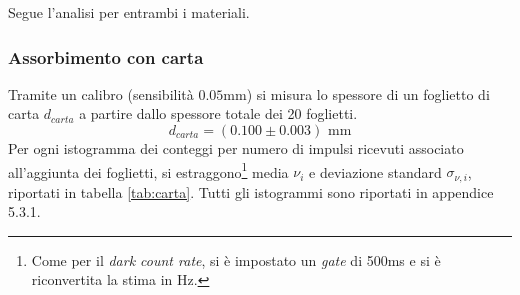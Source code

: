 Segue l'analisi per entrambi i materiali.

\subsubsection{Assorbimento con carta}
Tramite un calibro (sensibilità $0.05$mm) si misura lo spessore di un foglietto di carta $d_{carta}$ a partire dallo spessore totale dei 20 foglietti. $$d_{carta} = ( 0.100 \pm 0.003 ) \text{ mm} $$ 
Per ogni istogramma dei conteggi per numero di impulsi ricevuti associato all'aggiunta dei foglietti, si estraggono\footnote{Come per il \textit{dark count rate}, si è impostato un \textit{gate} di 500ms e si è riconvertita la stima in Hz.} media $\nu_i$ e deviazione standard $\sigma_{\nu,i}$, riportati in tabella \ref{tab:carta}. Tutti gli istogrammi sono riportati in appendice 5.3.1.

